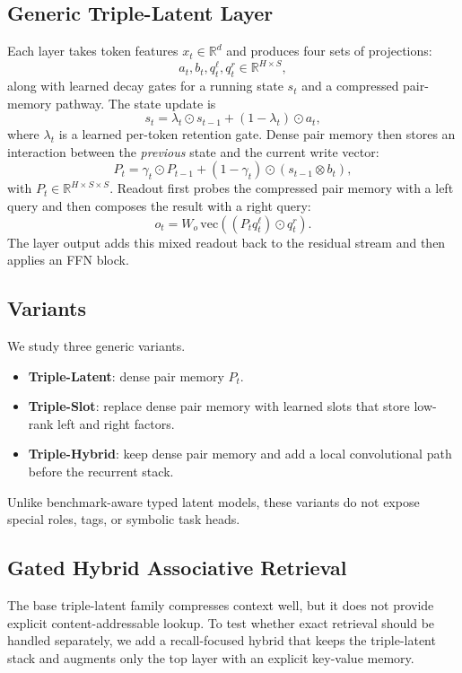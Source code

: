 \documentclass[11pt]{article}
\begin{document}
\subsection{Generic Triple-Latent Layer}
Each layer takes token features $x_t \in \mathbb{R}^d$ and produces four sets
of projections:
\begin{equation}
a_t, b_t, q_t^\ell, q_t^r \in \mathbb{R}^{H \times S},
\end{equation}
along with learned decay gates for a running state $s_t$ and a compressed
pair-memory pathway. The state update is
\begin{equation}
s_t = \lambda_t \odot s_{t-1} + (1 - \lambda_t) \odot a_t,
\end{equation}
where $\lambda_t$ is a learned per-token retention gate. Dense pair memory then
stores an interaction between the \emph{previous} state and the current write
vector:
\begin{equation}
P_t = \gamma_t \odot P_{t-1} + (1 - \gamma_t) \odot (s_{t-1} \otimes b_t),
\end{equation}
with $P_t \in \mathbb{R}^{H \times S \times S}$. Readout first probes the
compressed pair memory with a left query and then composes the result with a
right query:
\begin{equation}
o_t = W_o \, \mathrm{vec}\!\left((P_t q_t^\ell) \odot q_t^r\right).
\end{equation}
The layer output adds this mixed readout back to the residual stream and then
applies an FFN block.

\subsection{Variants}
We study three generic variants.
\begin{itemize}[leftmargin=1.25em]
  \item \textbf{Triple-Latent}: dense pair memory $P_t$.
  \item \textbf{Triple-Slot}: replace dense pair memory with learned slots that
  store low-rank left and right factors.
  \item \textbf{Triple-Hybrid}: keep dense pair memory and add a local
  convolutional path before the recurrent stack.
\end{itemize}

Unlike benchmark-aware typed latent models, these variants do not expose
special roles, tags, or symbolic task heads.

\subsection{Gated Hybrid Associative Retrieval}
The base triple-latent family compresses context well, but it does not provide
explicit content-addressable lookup. To test whether exact retrieval should be
handled separately, we add a recall-focused hybrid that keeps the triple-latent
stack and augments only the top layer with an explicit key-value memory.
\end{document}
